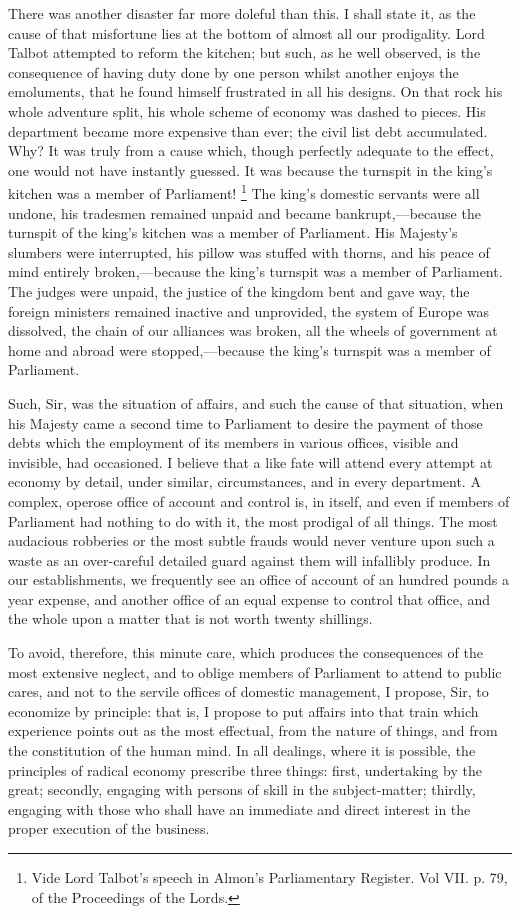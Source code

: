 There was another disaster far more doleful than this. I shall state it, as the cause of that misfortune lies at the bottom of almost all our prodigality. Lord Talbot attempted to reform the kitchen; but such, as he well observed, is the consequence of having duty done by one person whilst another enjoys the emoluments, that he found himself frustrated in all his designs. On that rock his whole adventure split, his whole scheme of economy was dashed to pieces. His department became more expensive than ever; the civil list debt accumulated. Why? It was truly from a cause which, though perfectly adequate to the effect, one would not have instantly guessed. It was because the turnspit in the king's kitchen was a member of Parliament!
\footnote{ Vide Lord Talbot's speech in Almon's Parliamentary Register. Vol VII. p. 79, of the Proceedings of the Lords.}
 The king's domestic servants were all undone, his tradesmen remained unpaid and became bankrupt,—because the turnspit of the king's kitchen was a member of Parliament. His Majesty's slumbers were interrupted, his pillow was stuffed with thorns, and his peace of mind entirely broken,—because the king's turnspit was a member of Parliament. The judges were unpaid, the justice of the kingdom bent and gave way, the foreign ministers remained inactive and unprovided, the system of Europe was dissolved, the chain of our alliances was broken, all the wheels of government at home and abroad were stopped,—because the king's turnspit was a member of Parliament.

Such, Sir, was the situation of affairs, and such the cause of that situation, when his Majesty came a second time to Parliament to desire the payment of those debts which the employment of its members in various offices, visible and invisible, had occasioned. I believe that a like fate will attend every attempt at economy by detail, under similar, circumstances, and in every department. A complex, operose office of account and control is, in itself, and even if members of Parliament had nothing to do with it, the most prodigal of all things. The most audacious robberies or the most subtle frauds would never venture upon such a waste as an over-careful detailed guard against them will infallibly produce. In our establishments, we frequently see an office of account of an hundred pounds a year expense, and another office of an equal expense to control that office, and the whole upon a matter that is not worth twenty shillings.

To avoid, therefore, this minute care, which produces the consequences of the most extensive neglect, and to oblige members of Parliament to attend to public cares, and not to the servile offices of domestic management, I propose, Sir, to economize by principle: that is, I propose to put affairs into that train which experience points out as the most effectual, from the nature of things, and from the constitution of the human mind. In all dealings, where it is possible, the principles of radical economy prescribe three things: first, undertaking by the great; secondly, engaging with persons of skill in the subject-matter; thirdly, engaging with those who shall have an immediate and direct interest in the proper execution of the business.

